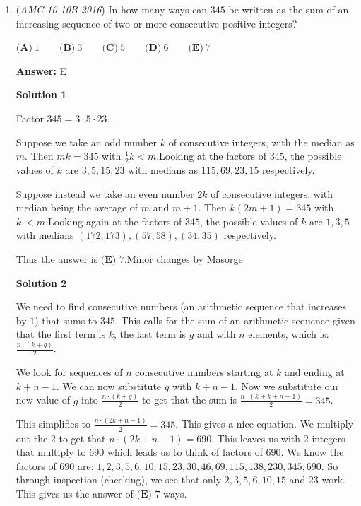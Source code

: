 \begin{enumerate}
 


	\item (\textit{AMC 10 10B 2016}) In how many ways can $345$ be written as the sum of an increasing sequence of two or more consecutive positive integers?


 $\textbf{(A)}\ 1\qquad\textbf{(B)}\ 3\qquad\textbf{(C)}\ 5\qquad\textbf{(D)}\ 6\qquad\textbf{(E)}\ 7$

 \textbf{Answer: }E



\textbf{Solution 1}

Factor $345=3\cdot 5\cdot 23$.

 Suppose we take an odd number $k$ of consecutive integers, with the median as $m$. Then $mk=345$ with $\frac12k<m$.Looking at the factors of $345$, the possible values of $k$ are $3,5,15,23$ with medians as $115,69,23,15$ respectively.

 Suppose instead we take an even number $2k$ of consecutive integers, with median being the average of $m$ and $m+1$. Then $k(2m+1)=345$ with $k\ < m$.Looking again at the factors of $345$, the possible values of $k$ are $1,3,5$ with medians $(172,173),(57,58),(34,35)$ respectively.

 Thus the answer is $\boxed{\textbf{(E) }7}$.Minor changes by Masorge

 



\textbf{Solution 2}

We need to find consecutive numbers (an arithmetic sequence that increases by $1$) that sums to $345$. This calls for the sum of an arithmetic sequence given that the first term is $k$, the last term is $g$ and with $n$ elements, which is: $\frac {n \cdot (k+g)}{2}$.

 We look for sequences of $n$ consecutive numbers starting at $k$ and ending at $k+n-1$. We can now substitute $g$ with $k+n-1$. Now we substitute our new value of $g$ into $\frac {n \cdot (k+g)}{2}$ to get that the sum is $\frac {n \cdot (k+k+n-1)}{2} = 345$.

 This simplifies to $\frac {n \cdot (2k+n-1)}{2} = 345$. This gives a nice equation. We multiply out the 2 to get that $n \cdot (2k+n-1)=690$. This leaves us with 2 integers that multiply to $690$ which leads us to think of factors of $690$. We know the factors of $690$ are:  $1,2,3,5,6,10,15,23,30,46,69,115,138,230,345,690$. So through inspection (checking), we see that only $2,3,5,6,10,15$ and $23$ work. This gives us the answer of $\boxed{\textbf{(E) }7}$ ways.


\end{enumerate}
